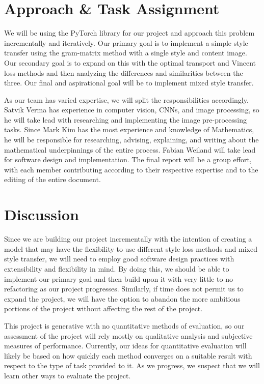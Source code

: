 \documentclass[12pt]{article}
\begin{document}
\section{Approach \& Task Assignment}
We will be using the PyTorch library for our project and approach this problem
incrementally and iteratively. Our primary goal is to implement a simple style
transfer using the gram-matrix method with a single style and content image.
Our secondary goal is to expand on this with the optimal transport and Vincent
loss methods and then analyzing the differences and similarities between the
three.  Our final and aspirational goal will be to implement mixed style
transfer.

As our team has varied expertise, we will split the responsibilities
accordingly.  Satvik Verma has experience in computer vision, CNNs, and image
processing, so he will take lead with researching and implementing the image
pre-processing tasks.  Since Mark Kim has the most experience and knowledge of
Mathematics, he will be responsible for researching, advising, explaining, and
writing about the mathematical underpinnings of the entire process.  Fabian
Weiland will take lead for software design and implementation. The final
report will be a group effort, with each member contributing according to their
respective expertise and to the editing of the entire document.

\section{Discussion}
Since we are building our project incrementally with the intention of creating a
model that may have the flexibility to use different style loss methods and
mixed style transfer, we will need to employ good software design practices with
extensibility and flexibility in mind.  By doing this, we should be able to
implement our primary goal and then build upon it with very little to no
refactoring as our project progresses.  Similarly, if time does not permit us to
expand the project, we will have the option to abandon the more ambitious
portions of the project without affecting the rest of the project.

This project is generative with no quantitative methods of evaluation, so our
assessment of the project will rely mostly on qualitative analysis and subjective
measures of performance.  Currently, our ideas for quantitative evaluation will
likely be based on how quickly each method converges on a suitable result with
respect to the type of task provided to it.  As we progress, we suspect that we
will learn other ways to evaluate the project.
\end{document}
